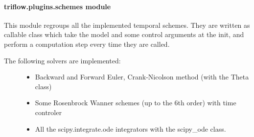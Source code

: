 \documentclass[letterpaper,10pt,english]{sphinxmanual}
\begin{document}
\paragraph{triflow.plugins.schemes module}
\label{\detokenize{triflow.plugins:module-triflow.plugins.schemes}}\label{\detokenize{triflow.plugins:triflow-plugins-schemes-module}}
This module regroups all the implemented temporal schemes.
They are written as callable class which take the model and some control
arguments at the init, and perform a computation step every time they are
called.
\begin{description}
\item[{The following solvers are implemented:}] \leavevmode\begin{itemize}
\item {} 
Backward and Forward Euler, Crank-Nicolson method (with the Theta class)

\item {} 
Some Rosenbrock Wanner schemes (up to the 6th order) with time controler

\item {} 
All the scipy.integrate.ode integrators with the scipy\_ode class.

\end{itemize}

\end{description}
\end{document}
